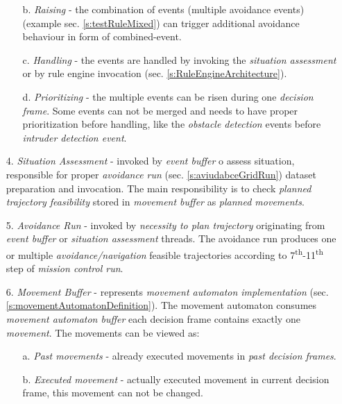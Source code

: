 \begin{itemize}
\begin{itemize}
        \item[b.] \emph{Raising} - the combination of events (multiple avoidance events) (example sec. \ref{s:testRuleMixed}) can trigger additional avoidance behaviour in form of combined-event.
        
        \item[c.] \emph{Handling} - the events are handled by invoking the \emph{situation assessment} or by rule engine invocation (sec. \ref{s:RuleEngineArchitecture}).
        
        \item[d.] \emph{Prioritizing} - the multiple events can be risen during one \emph{decision frame}. Some events can not be merged and needs to have proper prioritization before handling, like the \emph{obstacle detection} events before \emph{intruder detection event}.
    \end{itemize}
    
    \item[4.] \emph{Situation Assessment} - invoked by \emph{event buffer} o assess situation, responsible for proper \emph{avoidance run} (sec. \ref{s:aviudabceGridRun}) dataset preparation and invocation. The main responsibility is to check \emph{planned trajectory feasibility} stored in \emph{movement buffer} as \emph{planned movements}.
    
    \item[5.] \emph{Avoidance Run} - invoked by \emph{necessity to plan trajectory} originating from \emph{event buffer} or \emph{situation assessment} threads. The avoidance run produces one or multiple \emph{avoidance/navigation} feasible trajectories according to  7\textsuperscript{th}-11\textsuperscript{th} step of \emph{mission control run}.
    
    \item[6.] \emph{Movement Buffer} - represents \emph{movement automaton implementation} (sec. \ref{s:movementAutomatonDefinition}). The movement automaton consumes \emph{movement automaton buffer} each decision frame contains exactly one \emph{movement}. The movements can be viewed as:
    \begin{itemize}
        \item[a.] \emph{Past movements} - already executed movements in \emph{past decision frames}.
        
        \item[b.] \emph{Executed movement} - actually executed movement in current decision frame, this movement can not be changed.
        

\end{itemize}
\end{itemize}
